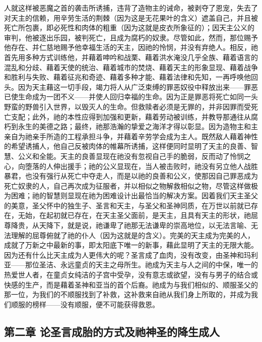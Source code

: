 人就这样被恶魔之首的袭击所诱捕，违背了造物主的诫命，被剥夺了恩宠，失去了对天主的信赖，用辛劳生活的荆棘（因为这是无花果叶的含义）遮盖自己，并且被死亡所包裹，即必死性和肉体的粗重（因为这就是皮衣所象征的）；因天主公义的审判，他被逐出乐园，被判死亡，且成为腐朽的奴隶。尽管如此，然而，那位赐予他存在、并仁慈地赐予他幸福生活的天主，因祂的怜悯，并没有弃绝人。相反，祂首先用多种方式训练他，并藉着呻吟和战栗、藉着洪水淹没几乎全族、藉着语言的混乱和分歧、藉着天使的统治、藉着城市的焚烧、藉着天主的形象显现、藉着战争和胜利与失败、藉着征兆和奇迹、藉着多种才能、藉着法律和先知，一再呼唤他回头。因为天主藉这一切手段，竭力将人从广泛束缚的罪恶奴役中释放出来——罪恶已使生命成为一团不义——并使人回归幸福的生命。因为正是罪恶将死亡如同一头野蛮的野兽引入世界，以毁灭人的生命。但救赎者必须是无罪的，并非因罪而受死亡支配；此外，祂的本性应得到加强和更新，藉着劳动被训练，并教导那通往从腐朽到永生的美德之路；最终，祂那浩瀚的挚爱之海洋才得以彰显。因为造物主和主亲自为祂亲手所造的工程承担斗争，并藉着辛劳学会成为主人。既然敌人藉着神性的希望诱捕人，他自己反被肉体的帷幕所诱捕，这样便同时显明了天主的良善、智慧、公义和全能。天主的良善显现在祂没有忽视自己手的脆弱，反而动了怜悯之心，向堕落的人伸出援手；祂的公义显现在，当人被击败时，祂没有另立他人战胜暴君，也没有强行从死亡中夺走人，而是以祂的良善和公义，使那因自己罪恶成为死亡奴隶的人，自己再次成为征服者，并以相似之物解救相似之物，尽管这样做极为困难；祂的智慧则显现在祂为困难设计出最恰当的解决方案。因着我们天主圣父的美意，圣父怀中的独生子、圣言和天主，与圣父和圣神同质，在万世以前就已存在，无始，在起初就已存在，在天主圣父面前，是天主，且具有天主的形状，祂屈尊降贵，从天降下，就是说，祂谦卑了祂那无法谦卑的崇高地位，以无法言喻、无法理解的屈尊俯就了祂的仆人（因为这就是的含义）。完美的天主成为完美的人，成就了万新之中最新的事，即太阳底下唯一的新事，藉此显明了天主的无限大能。因为还有什么比天主成为人更伟大的呢？圣言成了血肉，没有改变，由圣神和玛利亚——那位圣洁、永远童贞的天主之母所生。祂成为天主与人之间的中保，唯一的热爱世人者，在童贞女纯洁的子宫中受孕，没有意志或欲望，没有与男子的结合或快感的生产，而是藉着圣神和亚当的首个后裔。祂成为与我们相似的、顺服圣父的那一位，为我们的不顺服找到了补救，这补救来自祂从我们身上所取的，并成为我们顺服的榜样——没有顺服，便不可能获得救恩。\par


\subsection{第二章 论圣言成胎的方式及祂神圣的降生成人}

